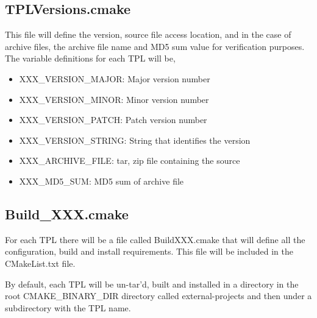 \documentclass[12pt]{article}
\begin{document}
\subsection{TPLVersions.cmake}
This file will define the version, source file access location, and in the case of archive files, the archive file name and MD5
sum value for verification purposes. The variable definitions for each TPL will be,
\begin{itemize}
\item XXX\_VERSION\_MAJOR: Major version number
\item XXX\_VERSION\_MINOR: Minor version number
\item XXX\_VERSION\_PATCH: Patch version number
\item XXX\_VERSION\_STRING: String that identifies the version
\item XXX\_ARCHIVE\_FILE: tar, zip file containing the source
\item XXX\_MD5\_SUM: MD5 sum of archive file
\end{itemize}

\subsection{Build\_XXX.cmake}
For each TPL there will be a file called BuildXXX.cmake that will define all the configuration, build and install
requirements. This file will be included in the CMakeList.txt file.

By default, each TPL will be un-tar'd, built and installed in a directory  in the root CMAKE\_BINARY\_DIR directory
called external-projects and then under a subdirectory with the TPL name.
\end{document}
